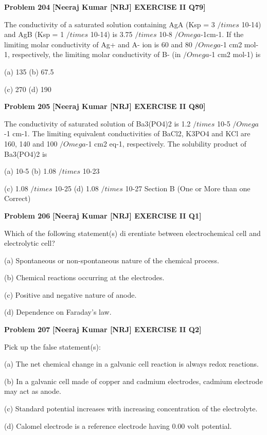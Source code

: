 \begin{problembox}
\textbf{Problem 204} \hfill \textbf{[Neeraj Kumar [NRJ] EXERCISE II Q79]}
\label{q:ext-nrj_all_questions-204}

The 
conductivity 
of 
a 
saturated 
solution 
containing AgA (Ksp = 3 $/times$ 10-14) and AgB (Ksp 
= 1 $/times$ 10-14) is 3.75 $/times$ 10-8 $/Omega$-1cm-1. If the limiting 
molar conductivity of Ag+ and A- ion is 60 and 
80 $/Omega$-1
 cm2 mol-1, respectively, the limiting molar 
conductivity of B- (in $/Omega$-1 cm2 mol-1) is
 
 (a) 135 
(b) 67.5
 
 (c) 270 
(d) 190
\end{problembox}

\begin{problembox}
\textbf{Problem 205} \hfill \textbf{[Neeraj Kumar [NRJ] EXERCISE II Q80]}
\label{q:ext-nrj_all_questions-205}

The conductivity of saturated solution of 
Ba3(PO4)2 is 1.2 $/times$ 10-5 $/Omega$-1 cm-1. The limiting 
equivalent conductivities of BaCl2, K3PO4 and 
KCl are 160, 140 and 100 $/Omega$-1 cm2 eq-1, respectively. 
The solubility product of Ba3(PO4)2 is
 
 (a) 10-5 
(b) 1.08 $/times$ 10-23
 
 (c) 1.08 $/times$ 10-25 
(d) 1.08 $/times$ 10-27
Section B (One or More than one Correct)
\end{problembox}

\begin{problembox}
\textbf{Problem 206} \hfill \textbf{[Neeraj Kumar [NRJ] EXERCISE II Q1]}
\label{q:ext-nrj_all_questions-206}

Which of the following statement(s) di  erentiate 
between electrochemical cell and electrolytic cell?
 
 (a)  Spontaneous or non-spontaneous nature of 
the chemical process.
 
 (b)  Chemical reactions occurring at the electrodes.
 
 (c)  Positive and negative nature of anode.
 
 (d) Dependence on Faraday's law.
\end{problembox}

\begin{problembox}
\textbf{Problem 207} \hfill \textbf{[Neeraj Kumar [NRJ] EXERCISE II Q2]}
\label{q:ext-nrj_all_questions-207}

Pick up the false statement(s):
 
 (a)  The net chemical change in a galvanic cell 
reaction is always redox reactions.
 
 (b)  In a galvanic cell made of copper and 
cadmium electrodes, cadmium electrode may 
act as anode.
 
 (c)  Standard potential increases with increasing 
concentration of the electrolyte.
 
 (d)  Calomel electrode is a reference electrode 
having 0.00 volt potential.
\end{problembox}

